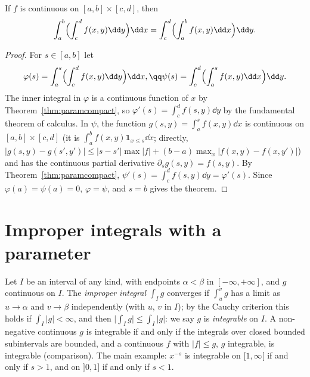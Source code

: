 \begin{theorem}\label{thm:fubinirect}
If $f$ is continuous on $[a,b]\times[c,d]$, then
\[
\int_a^b\Bigl(\int_c^df(x,y)\dd y\Bigr)\dd x=\int_c^d\Bigl(\int_a^bf(x,y)\dd x\Bigr)\dd y.
\]
\end{theorem}
\begin{proof}
For $s\in[a,b]$ let
\[
\begin{gathered}\varphi(s)=\int_a^s\Bigl(\int_c^df(x,y)\dd y\Bigr)\dd x,\qq\psi(s)=\int_c^d\Bigl(\int_a^sf(x,y)\dd x\Bigr)\dd y.\end{gathered}
\]
The inner
integral in $\varphi$ is a continuous function of $x$ by Theorem~\ref{thm:paramcompact}, so $\varphi'(s)=\int_c^df(s,y)\dd y$ by the
fundamental theorem of calculus. In $\psi$, the function $g(s,y)=\int_a^sf(x,y)\dd x$ is continuous on $[a,b]\times[c,d]$ (it is
$\int_a^bf(x,y)\mathbf 1_{x\le s}\dd x$; directly, $|g(s,y)-g(s',y')|\le|s-s'|\max|f|+(b-a)\max_x|f(x,y)-f(x,y')|$) and has the
continuous partial derivative $\partial_sg(s,y)=f(s,y)$. By Theorem~\ref{thm:paramcompact}, $\psi'(s)=\int_c^df(s,y)\dd y=\varphi'(s)$.
Since $\varphi(a)=\psi(a)=0$, $\varphi=\psi$, and $s=b$ gives the theorem.
\end{proof}

\section{Improper integrals with a parameter}

Let $I$ be an interval of any kind, with endpoints $\alpha<\beta$ in $[-\infty,+\infty]$, and $g$ continuous on $I$. The
\emph{improper integral} $\int_Ig$ converges if $\int_u^vg$ has a limit as $u\to\alpha$ and $v\to\beta$ independently (with $u$, $v$ in
$I$); by the Cauchy criterion this holds if $\int_I|g|<\infty$, and then $\bigl|\int_Ig\bigr|\le\int_I|g|$: we say $g$ is
\emph{integrable} on $I$. A non-negative continuous $g$ is integrable if and only if the integrals over closed bounded
subintervals are bounded, and a continuous $f$ with $|f|\le g$, $g$ integrable, is integrable (comparison). The main
example: $x^{-s}$ is integrable on $[1,\infty[$ if and only if $s>1$, and on $]0,1]$ if and only if $s<1$.

